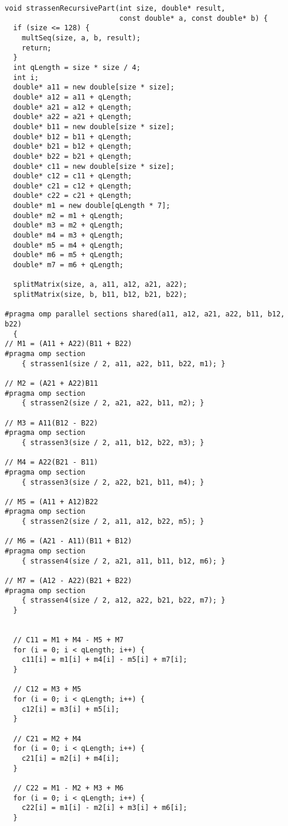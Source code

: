 \documentclass{report}
\begin{document}
\begin{center}
\begin{lstlisting}
void strassenRecursivePart(int size, double* result,
                           const double* a, const double* b) {
  if (size <= 128) {
    multSeq(size, a, b, result);
    return;
  }
  int qLength = size * size / 4;
  int i;
  double* a11 = new double[size * size];
  double* a12 = a11 + qLength;
  double* a21 = a12 + qLength;
  double* a22 = a21 + qLength;
  double* b11 = new double[size * size];
  double* b12 = b11 + qLength;
  double* b21 = b12 + qLength;
  double* b22 = b21 + qLength;
  double* c11 = new double[size * size];
  double* c12 = c11 + qLength;
  double* c21 = c12 + qLength;
  double* c22 = c21 + qLength;
  double* m1 = new double[qLength * 7];
  double* m2 = m1 + qLength;
  double* m3 = m2 + qLength;
  double* m4 = m3 + qLength;
  double* m5 = m4 + qLength;
  double* m6 = m5 + qLength;
  double* m7 = m6 + qLength;

  splitMatrix(size, a, a11, a12, a21, a22);
  splitMatrix(size, b, b11, b12, b21, b22);

#pragma omp parallel sections shared(a11, a12, a21, a22, b11, b12, b22)
  {
// M1 = (A11 + A22)(B11 + B22)
#pragma omp section
    { strassen1(size / 2, a11, a22, b11, b22, m1); }

// M2 = (A21 + A22)B11
#pragma omp section
    { strassen2(size / 2, a21, a22, b11, m2); }

// M3 = A11(B12 - B22)
#pragma omp section
    { strassen3(size / 2, a11, b12, b22, m3); }

// M4 = A22(B21 - B11)
#pragma omp section
    { strassen3(size / 2, a22, b21, b11, m4); }

// M5 = (A11 + A12)B22
#pragma omp section
    { strassen2(size / 2, a11, a12, b22, m5); }

// M6 = (A21 - A11)(B11 + B12)
#pragma omp section
    { strassen4(size / 2, a21, a11, b11, b12, m6); }

// M7 = (A12 - A22)(B21 + B22)
#pragma omp section
    { strassen4(size / 2, a12, a22, b21, b22, m7); }
  }


  // C11 = M1 + M4 - M5 + M7
  for (i = 0; i < qLength; i++) {
    c11[i] = m1[i] + m4[i] - m5[i] + m7[i];
  }

  // C12 = M3 + M5
  for (i = 0; i < qLength; i++) {
    c12[i] = m3[i] + m5[i];
  }

  // C21 = M2 + M4
  for (i = 0; i < qLength; i++) {
    c21[i] = m2[i] + m4[i];
  }

  // C22 = M1 - M2 + M3 + M6
  for (i = 0; i < qLength; i++) {
    c22[i] = m1[i] - m2[i] + m3[i] + m6[i];
  }


\end{lstlisting}
\end{center}
\end{document}
